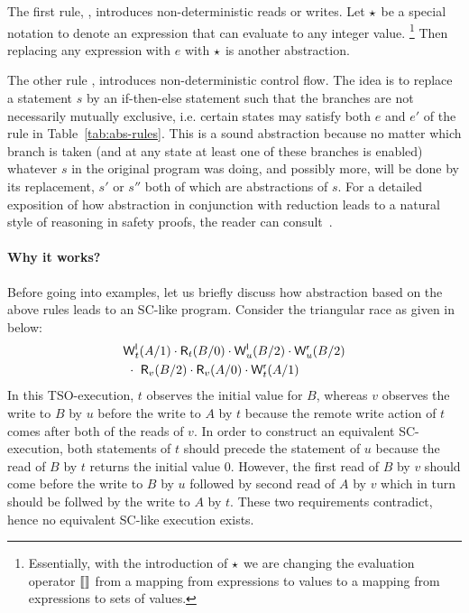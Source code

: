 
The first rule, {}, introduces non-deterministic reads or writes.
Let $\star$ be a special notation to denote an expression that can evaluate to any integer value.
\footnote{Essentially, with the introduction of $\star$ we are changing the evaluation operator $\llbracket \rrbracket$ from a mapping from expressions to values to a mapping from expressions to sets of values.}
Then replacing any expression with $e$ with $\star$ is another abstraction.

The other rule {}, introduces non-deterministic control flow.
The idea is to replace a statement $s$ by an if-then-else statement such that the branches are not necessarily mutually exclusive, i.e. certain states may satisfy both $e$ and $e'$ of the rule in Table~\ref{tab:abs-rules}.
This is a sound abstraction because no matter which branch is taken (and at any state at least one of these branches is enabled) whatever $s$ in the original program was doing, and possibly more, will be done by its replacement, $s'$ or $s''$ both of which are abstractions of $s$.  
For a detailed exposition of how abstraction in conjunction with reduction leads to a natural style of reasoning in safety proofs, the reader can consult~\cite{EQT2009}.

\paragraph{Why it works?}
Before going into examples, let us briefly discuss how abstraction based on the above rules leads to an SC-like program. 
Consider the triangular race as given in~\cite{Owe2010} below:
\begin{eqnarray*}
&\mathsf{W}^{\mathsf{l}}_{t}(A/1) \cdot \mathsf{R}_{t}(B/0) \cdot \mathsf{W}^{\mathsf{l}}_{u}(B/2) \cdot \mathsf{W}^{\mathsf{r}}_{u}(B/2)\\
&\ \cdot\ \mathsf{R}_{v}(B/2) \cdot \mathsf{R}_{v}(A/0) \cdot \mathsf{W}^{\mathsf{r}}_{t}(A/1)
\end{eqnarray*}
In this TSO-execution, $t$ observes the initial value for $B$, whereas $v$ observes the write to $B$ by $u$ before the write to $A$ by $t$ because the remote write action of $t$ comes after both of the reads of $v$.
In order to construct an equivalent SC-execution, both statements of $t$ should precede the statement of $u$ because the read of $B$ by $t$ returns the initial value 0.
However, the first read of $B$ by $v$ should come before the write to $B$ by $u$ followed by second read of $A$ by $v$ which in turn should be follwed by the write to $A$ by $t$.
These two requirements contradict, hence no equivalent SC-like execution exists.

